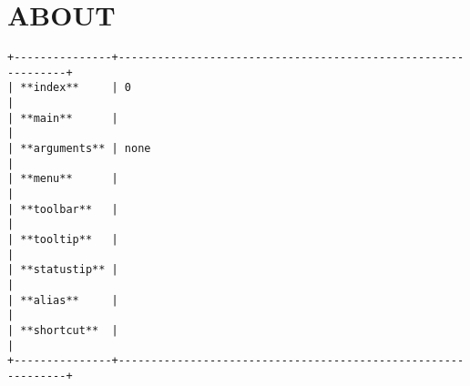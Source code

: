 \section{ABOUT}

\begin{verbatim}
+---------------+--------------------------------------------------------------+
| **index**     | 0                                                            |
| **main**      |                                                              |
| **arguments** | none                                                         |
| **menu**      |                                                              |
| **toolbar**   |                                                              |
| **tooltip**   |                                                              |
| **statustip** |                                                              |
| **alias**     |                                                              |
| **shortcut**  |                                                              |
+---------------+--------------------------------------------------------------+
\end{verbatim}
